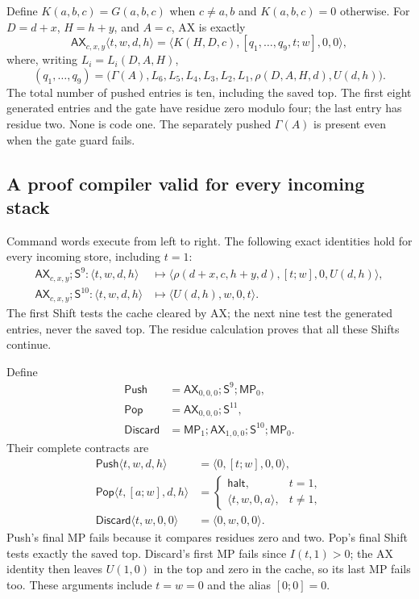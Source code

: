 Define $K(a,b,c)=G(a,b,c)$ when $c\ne a,b$ and $K(a,b,c)=0$
otherwise.  For $D=d+x$, $H=h+y$, and $A=c$, AX is exactly
\[
 \mathsf{AX}_{c,x,y}\langle t,w,d,h\rangle
 =\langle K(H,D,c),[q_1,\ldots,q_9,t;w],0,0\rangle,
\]
where, writing $L_i=L_i(D,A,H)$,
\[
 (q_1,\ldots,q_9)=
 \bigl(\Gamma(A),L_6,L_5,L_4,L_3,L_2,L_1,
              \rho(D,A,H,d),U(d,h)\bigr).
\]
The total number of pushed entries is ten, including the saved top.
The first eight generated entries and the gate have residue zero modulo
four; the last entry has residue two.  None is code one.  The separately
pushed $\Gamma(A)$ is present even when the gate guard fails.

\subsection{A proof compiler valid for every incoming stack}
\label{cal:compiler}

Command words execute from left to right.  The following exact
identities hold for every incoming store, including $t=1$:
\begin{align*}
 \mathsf{AX}_{c,x,y};\mathsf S^9:
 \langle t,w,d,h\rangle
 &\longmapsto\langle\rho(d+x,c,h+y,d),[t;w],0,U(d,h)\rangle,\\
 \mathsf{AX}_{c,x,y};\mathsf S^{10}:
 \langle t,w,d,h\rangle
 &\longmapsto\langle U(d,h),w,0,t\rangle.
\end{align*}
The first Shift tests the cache cleared by AX; the next nine test the
generated entries, never the saved top.  The residue calculation proves
that all these Shifts continue.

Define
\begin{align*}
 \mathsf{Push}&=\mathsf{AX}_{0,0,0};\mathsf S^9;\mathsf{MP}_0,\\
 \mathsf{Pop}&=\mathsf{AX}_{0,0,0};\mathsf S^{11},\\
 \mathsf{Discard}&=\mathsf{MP}_1;\mathsf{AX}_{1,0,0};
                         \mathsf S^{10};\mathsf{MP}_0.
\end{align*}
Their complete contracts are
\begin{align*}
 \mathsf{Push}\langle t,w,d,h\rangle&=\langle0,[t;w],0,0\rangle,\\
 \mathsf{Pop}\langle t,[a;w],d,h\rangle
 &=\begin{cases}\mathsf{halt},&t=1,\\
                 \langle t,w,0,a\rangle,&t\ne1,
   \end{cases}\\
 \mathsf{Discard}\langle t,w,0,0\rangle&=\langle0,w,0,0\rangle.
\end{align*}
Push's final MP fails because it compares residues zero and two.
Pop's final Shift tests exactly the saved top.  Discard's first MP
fails since $I(t,1)>0$; the AX identity then leaves $U(1,0)$ in
the top and zero in the cache, so its last MP fails too.  These arguments
include $t=w=0$ and the alias $[0;0]=0$.

